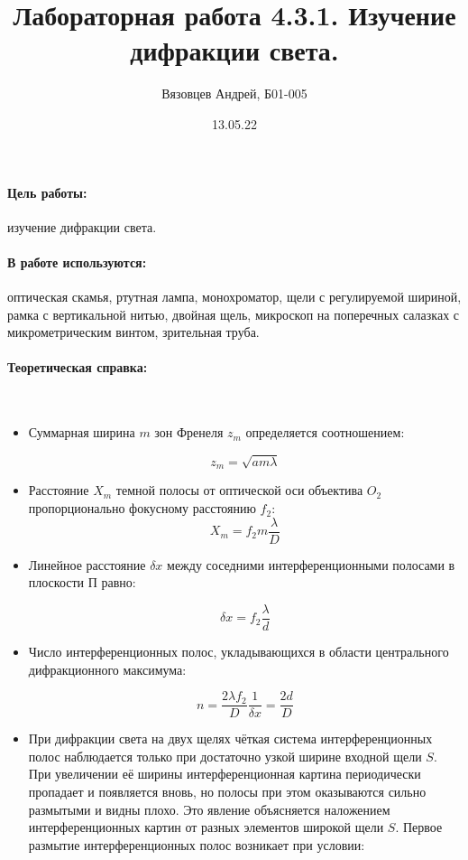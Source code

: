 \documentclass[a4paper, 12pt]{article}
\author{Вязовцев Андрей, Б01-005}
\date{13.05.22}
\title{Лабораторная работа 4.3.1. Изучение дифракции света.}
\newcommand{\parag}[1]{\paragraph*{#1:}}
\begin{document}
\maketitle

\parag {Цель работы} изучение дифракции света.

\parag {В работе используются} оптическая скамья, ртутная лампа, монохроматор, щели с регулируемой шириной, рамка с вертикальной нитью, двойная щель, микроскоп на поперечных салазках с микрометрическим винтом, зрительная труба.

\parag {Теоретическая справка} ~\\

\begin{itemize}
    \item Суммарная ширина $m$ зон Френеля $z_m$ определяется соотношением:
    
    \begin{equation*}
        z_m = \sqrt{a m \lambda}
    \end{equation*}

    \item Расстояние $X_m$ темной полосы от оптической оси объектива $O_2$ пропорционально фокусному расстоянию $f_2$:
    \begin{equation*}
        X_m = f_2 m \dfrac{\lambda}{D}
    \end{equation*}

    \item Линейное расстояние $\delta x$ между соседними интерференционными полосами в плоскости П равно:
    
    \begin{equation*}
        \delta x = f_2 \dfrac{\lambda}{d}
    \end{equation*}

    \item Число интерференционных полос, укладывающихся в области центрального дифракционного максимума:
    
    \begin{equation*}
        n = \dfrac{2 \lambda f_2}{D} \dfrac{1}{\delta x} = \dfrac{2 d}{D}
    \end{equation*}

    \item При дифракции света на двух щелях чёткая система интерференционных полос наблюдается только при достаточно узкой ширине входной щели $S$. При увеличении её ширины интерференционная картина периодически пропадает и появляется вновь, но полосы при этом оказываются сильно размытыми и видны плохо. Это явление объясняется наложением интерференционных картин от разных элементов широкой щели $S$.
    Первое размытие интерференционных полос возникает при условии:


\end{itemize}
\end{document}
